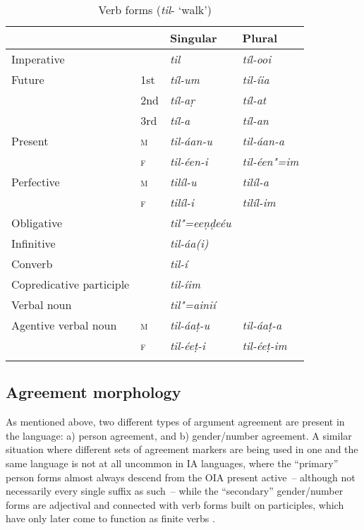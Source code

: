 \begin{table}[ht]
\caption{Verb forms (\textit{til}- `walk')}

\begin{tabularx}{\textwidth}{ Q l@{\hspace{20pt}} l@{\hspace{20pt}} l@{\hspace{20pt}} }
\lsptoprule
&
&
Singular &
Plural\\\hline
Imperative &
&
\textit{til} &
\textit{tíl-ooi} \\
Future &
1st &
\textit{tíl-um} &
\textit{til-íia} \\
&
2nd &
\textit{tíl-aṛ} &
\textit{tíl-at} \\
&
3rd &
\textit{tíl-a} &
\textit{tíl-an} \\
Present &
\textsc{m} &
\textit{til-áan-u} &
\textit{til-áan-a} \\
&
\textsc{f} &
\textit{til-éen-i} &
\textit{til-éen"=im} \\
Perfective &
\textsc{m} &
\textit{tilíl-u} &
\textit{tilíl-a} \\
&
\textsc{f} &
\textit{tilíl-i} &
\textit{tilíl-im} \\
Obligative &
&
\textit{til"=eeṇḍeéu} &
\\
Infinitive &
&
\textit{til-áa(i)} &
\\
Converb &
&
\textit{til-í} &
\\
Copredicative participle &
&
\textit{til-íim} &
\\
Verbal noun &
&
\textit{til"=ainií} &
\\
Agentive verbal noun &
\textsc{m} &
\textit{til-áaṭ-u} &
\textit{til-áaṭ-a} \\
&
\textsc{f} &
\textit{til-éeṭ-i} &
\textit{til-éeṭ-im} 
\\\lspbottomrule
\end{tabularx}
\label{tab:8-15}
\end{table}


\subsection{Agreement morphology}
\label{subsec:8-4-1}

As mentioned above, two different types of argument agreement are present in the language: a) person agreement, and b) gender/number agreement. A similar situation where different sets of agreement markers are being used in one and the same language is not at all uncommon in IA languages, where the ``primary'' person forms almost always descend from the OIA present active~-- although not necessarily every single suffix as such~-- while the ``secondary'' gender/number forms are adjectival and connected with verb forms built on participles, which have only later come to function as finite verbs \citep[259--260]{masica1991}. 




